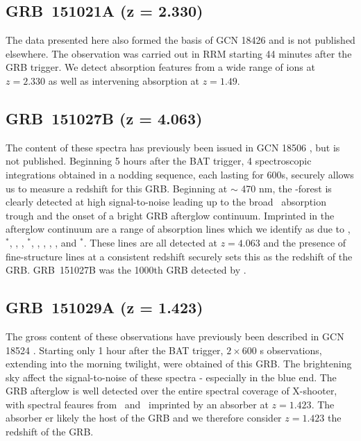 \documentclass{aa}    %
\begin{document}
\subsection{GRB~151021A (z = 2.330)}\label{151021}

The data presented here also formed the basis of GCN 18426 \citep{GCN18982} and
is not published elsewhere. The observation was carried out in RRM starting 44
minutes after the GRB trigger. We detect absorption features from a wide range
of ions at $z=2.330$ as well as intervening absorption at $z=1.49$.

\subsection{GRB~151027B (z = 4.063)}\label{151027}

The content of these spectra has previously been issued in GCN 18506
\citep{GCN18506}, but is not published. Beginning 5 hours after the BAT trigger,
4 spectroscopic integrations obtained in a nodding sequence, each lasting for
600s, securely allows us to measure a redshift for this GRB. Beginning at $\sim$
470 nm, the \lya-forest is clearly detected at high signal-to-noise leading up
to the broad \lya~absorption trough and the onset of a bright GRB afterglow
continuum. Imprinted in the afterglow continuum are a range of absorption lines
which we identify as due to \SIii, \SIii$^*$, \oi, \cii, \cii$^*$, \civ, \alii, 
\alii, \feii, and \feii$^*$. These lines are all detected at $z = 4.063$ and the
presence of fine-structure lines at a consistent redshift securely sets this as
the redshift of the GRB. GRB~151027B was the 1000th GRB detected by \swift.

\subsection{GRB~151029A (z = 1.423)}\label{151029}

The gross content of these observations have previously been described in GCN
18524 \citep{GCN18524}. Starting only 1 hour after the BAT trigger, $2 \times
600$ s observations, extending into the morning twilight, were obtained of this
GRB. The brightening sky affect the signal-to-noise of these spectra -
especially in the blue end. The GRB afterglow is well detected over the entire
spectral coverage of X-shooter, with spectral feaures from \feii~and
\mgii~imprinted by an absorber at $z = 1.423$. The absorber er likely the host
of the GRB and we therefore consider $z = 1.423$ the redshift of the GRB.
\end{document}
